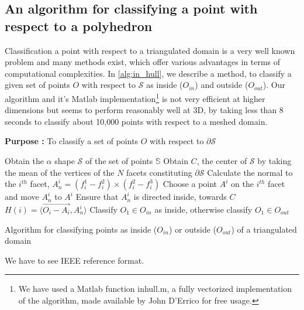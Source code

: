 \documentclass[12pt,a4]{article}
\begin{document}
\subsection{An algorithm for classifying a point with respect to a polyhedron}\label{app:polyhedron_point}
\indent Classification a point with respect to a triangulated domain is a very well known problem and many methods exist, which offer various advantages in terms of computational complexities. In \cref{alg:in_hull}, we describe a method, to classify a given set of points $O$ with respect to $\mathcal{S}$ as inside ($O_{in}$) and outside ($O_{out}$). Our algorithm and it's Matlab implementation\footnote{We have used a Matlab function inhull.m, a fully vectorized implementation of the algorithm, made available by John D'Errico for free usage. } is not very efficient at higher dimensions but seems to perform reasonably well at 3D, by taking less than 8 seconds to classify about 10,000 points with respect to a meshed domain. 
\begin{algorithm}[ht!]
	\textbf{Purpose :} To classify a set of points $ O $ with respect to $\partial \mathcal{S}$\\
	\begin{algorithmic}[1]
		\STATE Obtain the $\alpha$ shape $\mathcal{S}$ of the set of points $\mathbb{S}$
		\STATE Obtain $C$, the center of $\mathcal{S}$ by taking the mean of the vertices of the $N$ facets constituting $\partial \mathcal{S}$
		\STATE Calculate the normal to the $i^{th}$ facet, $A_n^i=(f_i^1-f_i^2)\times(f_i^2-f_i^3)$
		\STATE Choose a point $A^i$ on the $i^{th}$ facet and move $A_n^i$ to $A^i$
		\STATE Ensure that $A_n^i$ is directed inside, towards $C$
		\STATE $H(i)=\langle\vec{O_i-A_i}, A_n^i\rangle$
		\ENDFOR 
		\STATE Classify $O_1 \in O_{in}$ as inside, otherwise classify $O_1\in O_{out}$  		\ENDIF
	\end{algorithmic}
	
	\caption{Algorithm for classifying points as inside ($O_{in}$) or outside ($O_{out}$) of a triangulated domain}		
	\label{alg:in_hull}
\end{algorithm}

%


\begin{thebibliography}{99}

We have to see IEEE reference format.
%
%


\end{thebibliography}
\end{document}
